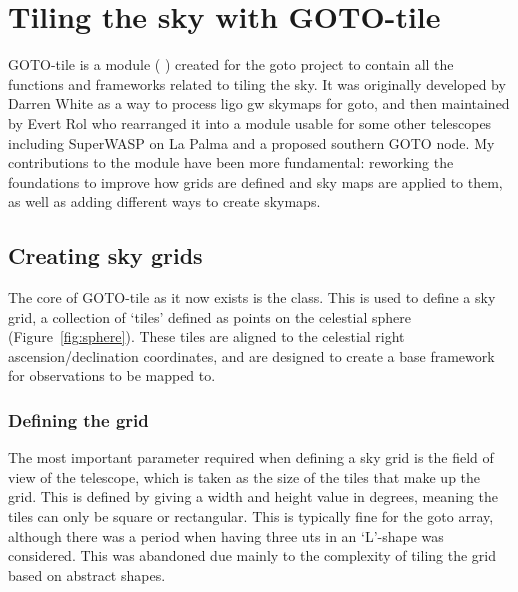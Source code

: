 \section{Tiling the sky with GOTO-tile}
\label{sec:tiling}
\begin{colsection}


\begin{colsection}

GOTO-tile is a  module ( ) created for the \gls{goto} project to contain all the functions and frameworks related to tiling the sky. It was originally developed by Darren White as a way to process \gls{ligo} \gls{gw} skymaps for \gls{goto}, and then maintained by Evert Rol who rearranged it into a module usable for some other telescopes including SuperWASP on La Palma and a proposed southern GOTO node. My contributions to the module have been more fundamental: reworking the foundations to improve how grids are defined and sky maps are applied to them, as well as adding different ways to create skymaps.

\end{colsection}


\subsection{Creating sky grids}
\label{sec:gototile}
\begin{colsection}

The core of GOTO-tile as it now exists is the  class. This is used to define a sky grid, a collection of `tiles' defined as points on the celestial sphere (Figure~\ref{fig:sphere}). These tiles are aligned to the celestial right ascension/declination coordinates, and are designed to create a base framework for observations to be mapped to.

\subsubsection{Defining the grid}

The most important parameter required when defining a sky grid is the field of view of the telescope, which is taken as the size of the tiles that make up the grid. This is defined by giving a width and height value in degrees, meaning the tiles can only be square or rectangular. This is typically fine for the \gls{goto} array, although there was a period when having three \glspl{ut} in an `L'-shape was considered. This was abandoned due mainly to the complexity of tiling the grid based on abstract shapes.


\end{colsection}
\end{colsection}
